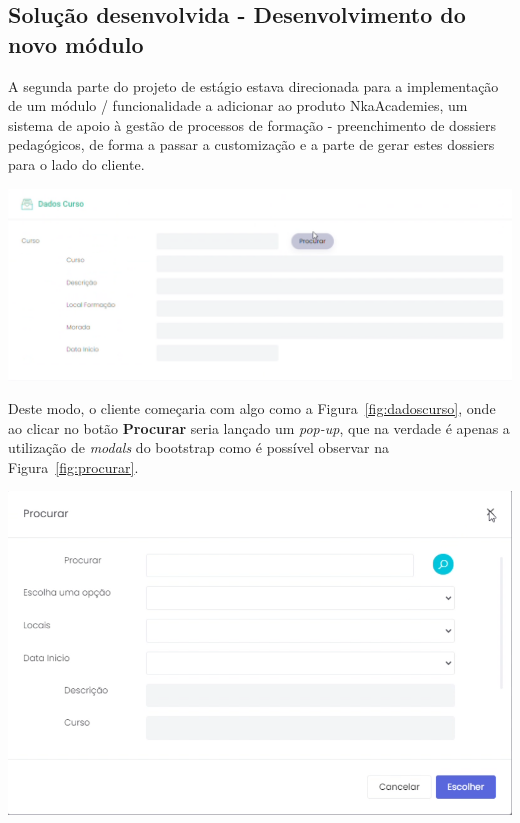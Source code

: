 \subsection{Solução desenvolvida - Desenvolvimento do novo módulo}

A segunda parte do projeto de estágio estava direcionada para a implementação de um módulo / funcionalidade a adicionar ao produto NkaAcademies, um sistema de apoio à gestão de processos de formação - preenchimento de dossiers pedagógicos, de forma a passar a customização e a parte de gerar estes dossiers para o lado do cliente.

\begin{center}
        \includegraphics[width=\textwidth,height=\textheight,keepaspectratio]{images/dadoscurso.png}
        \label{fig:dadoscurso}
\end{center}

Deste modo, o cliente começaria com algo como a Figura~\ref{fig:dadoscurso}, onde ao clicar no botão \textbf{Procurar} seria lançado um \textit{pop-up}, que na verdade é apenas a utilização de \textit{modals} do \gls{bootstrap} como é possível observar na Figura~\ref{fig:procurar}.

\begin{center}
        \includegraphics[width=\textwidth,height=\textheight,keepaspectratio]{images/procurar.png}
        \label{fig:procurar}
\end{center}

